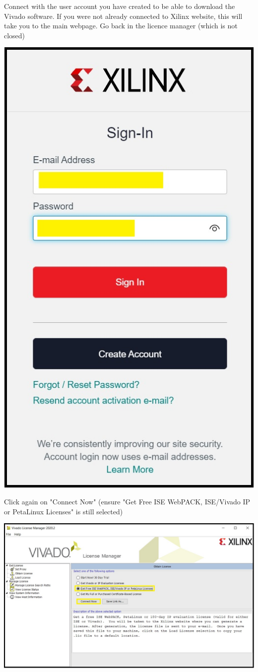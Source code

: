\begin{minipage}{\linewidth}
  Connect with the user account you have created to be able to download the Vivado software.
  If you were not already connected to Xilinx website, this will take you to the main webpage.
  Go back in the licence manager (which is not closed)
  \\
  \begin{center}
    \includegraphics[width=0.3\linewidth]{images/VivadoInstimg024.jpg}
  \end{center}
\end{minipage}

\begin{minipage}{\linewidth}
  Click again on "Connect Now" (ensure "Get Free ISE WebPACK, ISE/Vivado IP or PetaLinux Licenses" is still selected)
  \\
  \begin{center}
    \includegraphics[width=\linewidth]{images/VivadoInstimg023.jpg}
  \end{center}
\end{minipage}

